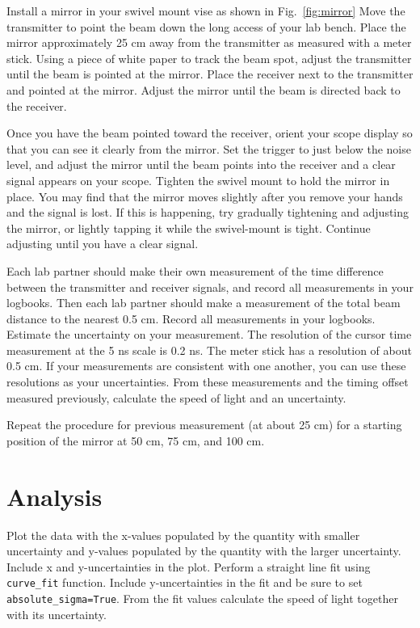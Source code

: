 Install a mirror in your swivel mount vise as shown in
Fig.~\ref{fig:mirror} Move the transmitter to point the beam down the
long access of your lab bench.  Place the mirror approximately 25 cm
away from the transmitter as measured with a meter stick.  Using a
piece of white paper to track the beam spot, adjust the transmitter
until the beam is pointed at the mirror.  Place the receiver next to
the transmitter and pointed at the mirror.  Adjust the mirror until
the beam is directed back to the receiver. 

Once you have the beam pointed toward the receiver, orient your scope
display so that you can see it clearly from the mirror.  Set the
trigger to just below the noise level, and adjust the mirror until the
beam points into the receiver and a clear signal appears on your
scope.  Tighten the swivel mount to hold the mirror in place.  You may
find that the mirror moves slightly after you remove your hands and
the signal is lost.  If this is happening, try gradually tightening
and adjusting the mirror, or lightly tapping it while the swivel-mount
is tight.  Continue adjusting until you have a clear signal.  

\begin{measurement}
Each lab partner should make their own measurement of
the time difference between the transmitter and receiver signals, and
record all measurements in your logbooks.  Then each lab partner
should make a measurement of the total beam distance to the nearest
0.5 cm.  Record all measurements in your logbooks.  Estimate the
uncertainty on your measurement.  The resolution of the cursor time
measurement at the 5 ns scale is 0.2 ns.  The meter stick has a
resolution of about 0.5 cm.  If your measurements are consistent with
one another, you can use these resolutions as your uncertainties.
From these measurements and the timing offset measured previously,
calculate the speed of light and an uncertainty.
\end{measurement}

\begin{measurement}
Repeat the procedure for previous measurement (at about 25 cm) for a starting position of the
mirror at 50 cm, 75 cm, and 100 cm.
\end{measurement}

\section{Analysis}

\begin{plot}
Plot the data with the x-values populated by the
quantity with smaller uncertainty and y-values populated by the
quantity with the larger uncertainty. Include x and y-uncertainties in
the plot. Perform a straight line fit using {\tt curve{\_}fit}
function. Include y-uncertainties in the fit and be sure to set {\tt absolute{\_}sigma=True}.  From the fit values
calculate the speed of light together with its uncertainty.
\end{plot}

